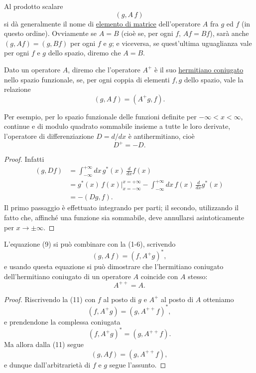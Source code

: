 \documentclass[11pt, a4paper]{book}
\numberwithin{equation}{section}
\begin{document}
Al prodotto scalare
\[
(g, A\,f)
\]
si dà generalmente il nome di \underline{elemento di matrice}
dell'operatore $A$ fra $g$ ed $f$ (in questo ordine). Ovviamente se
$A=B$ (cioè se, per ogni $f$, $Af=Bf$), sarà anche $(g,Af)=(g,Bf)$
per ogni $f$ e $g$; e viceversa, se quest'ultima uguaglianza vale per
ogni $f$ e $g$ dello spazio, diremo che $A=B$.

Dato un operatore $A$, diremo che l'operatore $A^+$ è il suo
\underline{hermitiano coniugato} nello spazio funzionale, se, per ogni
coppia di elementi $f,g$ dello spazio, vale la relazione
\begin{equation}
(g, A\,f) = (A^+g, f).
\end{equation}

Per esempio, per lo spazio funzionale delle funzioni definite per
$-\infty < x < \infty$, continue e di modulo quadrato sommabile insieme
a tutte le loro derivate, l'operatore di differenziazione $D = d/dx$ è
antihermitiano, cioè
\begin{equation}
D^+ = -D.
\end{equation}

\begin{proof}
Infatti
\begin{align*}
(g, Df) &= \int_{-\infty}^{+\infty} dx\, g^*(x)\,\frac{d}{dx}f(x) \\
  &= g^*(x)\,f(x)\Big|_{x=-\infty}^{x=+\infty}
     - \int_{-\infty}^{+\infty} dx\, f(x)\,\frac{d}{dx}g^*(x) \\
  &= -(Dg, f).
\end{align*}
Il primo passaggio è effettuato integrando per parti; il secondo,
utilizzando il fatto che, affinché una funzione sia sommabile, deve
annullarsi asintoticamente per $x \to \pm\infty$.
\end{proof}


L'equazione (9) si può combinare con la (1-6), scrivendo
\begin{equation}
(g, A\,f) = (f, A^+g)^*,
\end{equation}
e usando questa equazione si può dimostrare che l'hermitiano coniugato
dell'hermitiano coniugato di un operatore $A$ coincide con $A$ stesso:
\begin{equation}
A^{++} = A.
\end{equation}

\begin{proof}
Riscrivendo la (11) con $f$ al posto di $g$ e $A^+$ al posto di $A$
otteniamo
\[
(f, A^+g) = (g, A^{++}f)^*,
\]
e prendendone la complessa coniugata
\[
(f, A^+g)^* = (g, A^{++}f).
\]
Ma allora dalla (11) segue
\[
(g, Af) = (g, A^{++}f),
\]
e dunque dall'arbitrarietà di $f$ e $g$ segue l'assunto.
\end{proof}
\end{document}
